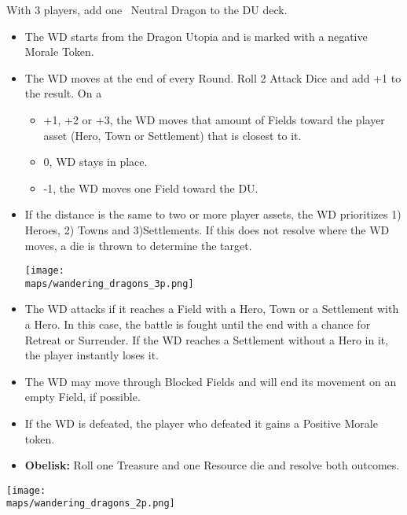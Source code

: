 \begin{multicols*}{2}
With 3 players, add one \golden\ Neutral Dragon to the DU deck.

\begin{itemize}
  \item The WD starts from the Dragon Utopia and is marked with a negative Morale Token.
  \item The WD moves at the end of every Round. Roll 2 Attack Dice and add +1 to the result. On a 
  \begin{itemize}
    \item +1, +2 or +3, the WD moves that amount of Fields toward the player asset (Hero, Town or Settlement) that is closest to it.
    \item 0, WD stays in place.
    \item -1, the WD moves one Field toward the DU.
  \end {itemize}
  \item If the distance is the same to two or more player assets, the WD prioritizes 1) Heroes, 2) Towns and 3)Settlements. If this does not resolve where the WD moves, a die is thrown to determine the target.

\begin{center}
  \vspace*{\fill}
  \texttt{[image: \\maps/wandering\_dragons\_3p.png]}
  \vspace*{\fill}
\end{center}

\columnbreak

  \item The WD attacks if it reaches a Field with a Hero, Town or a Settlement with a Hero. In this case, the battle is fought until the end with a chance for Retreat or Surrender. If the WD reaches a Settlement without a Hero in it, the player instantly loses it.
  \item The WD may move through Blocked Fields and will end its movement on an empty Field, if possible.
  \item If the WD is defeated, the player who defeated it gains a Positive Morale token.
  \item \textbf{Obelisk:} Roll one Treasure and one Resource die and resolve both outcomes.
\end{itemize}

\vspace*{\fill}

\begin{center}
  \texttt{[image: \\maps/wandering\_dragons\_2p.png]}
\end{center}

\end{multicols*}